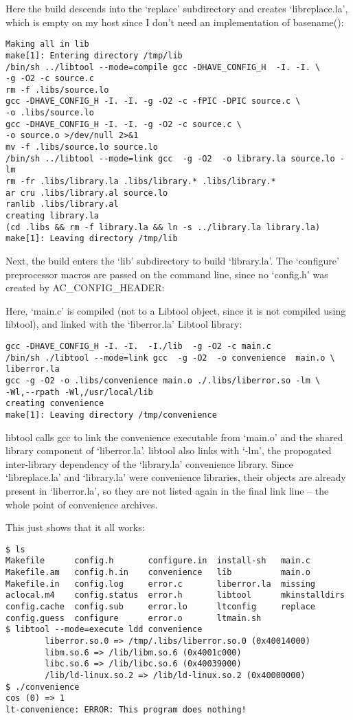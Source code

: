 Here the build descends into the `replace' subdirectory and 
creates `libreplace.la', which is empty on my host since I don't need an 
implementation of basename(): 

\begin{verbatim}
Making all in lib
make[1]: Entering directory /tmp/lib
/bin/sh ../libtool --mode=compile gcc -DHAVE_CONFIG_H  -I. -I. \
-g -O2 -c source.c
rm -f .libs/source.lo
gcc -DHAVE_CONFIG_H -I. -I. -g -O2 -c -fPIC -DPIC source.c \
-o .libs/source.lo
gcc -DHAVE_CONFIG_H -I. -I. -g -O2 -c source.c \
-o source.o >/dev/null 2>&1
mv -f .libs/source.lo source.lo
/bin/sh ../libtool --mode=link gcc  -g -O2  -o library.la source.lo -lm 
rm -fr .libs/library.la .libs/library.* .libs/library.*
ar cru .libs/library.al source.lo
ranlib .libs/library.al
creating library.la
(cd .libs && rm -f library.la && ln -s ../library.la library.la)
make[1]: Leaving directory /tmp/lib
\end{verbatim}

Next, the build enters the `lib' subdirectory to build `library.la'. The `configure' preprocessor macros are passed on the command line, since no `config.h' was created by AC\_{}CONFIG\_{}HEADER: 


Here, `main.c' is compiled (not to a Libtool object, since it is not compiled using libtool), and linked with the `liberror.la' Libtool library: 

\begin{verbatim}
gcc -DHAVE_CONFIG_H -I. -I.  -I./lib  -g -O2 -c main.c
/bin/sh ./libtool --mode=link gcc  -g -O2  -o convenience  main.o \
liberror.la 
gcc -g -O2 -o .libs/convenience main.o ./.libs/liberror.so -lm \
-Wl,--rpath -Wl,/usr/local/lib
creating convenience
make[1]: Leaving directory /tmp/convenience
\end{verbatim}

libtool calls gcc to link the convenience executable from `main.o' and the shared library component of `liberror.la'. libtool also links with `-lm', the propogated inter-library dependency of the `library.la' convenience library. Since `libreplace.la' and `library.la' were convenience libraries, their objects are already present in `liberror.la', so they are not listed again in the final link line -- the whole point of convenience archives. 


This just shows that it all works: 


\begin{lstlisting}[basicstyle=\scriptsize]
$ ls
Makefile      config.h       configure.in  install-sh   main.c
Makefile.am   config.h.in    convenience   lib          main.o
Makefile.in   config.log     error.c       liberror.la  missing
aclocal.m4    config.status  error.h       libtool      mkinstalldirs
config.cache  config.sub     error.lo      ltconfig     replace
config.guess  configure      error.o       ltmain.sh
$ libtool --mode=execute ldd convenience
        liberror.so.0 => /tmp/.libs/liberror.so.0 (0x40014000)
        libm.so.6 => /lib/libm.so.6 (0x4001c000)
        libc.so.6 => /lib/libc.so.6 (0x40039000)
        /lib/ld-linux.so.2 => /lib/ld-linux.so.2 (0x40000000)
$ ./convenience
cos (0) => 1
lt-convenience: ERROR: This program does nothing!
\end{lstlisting}

